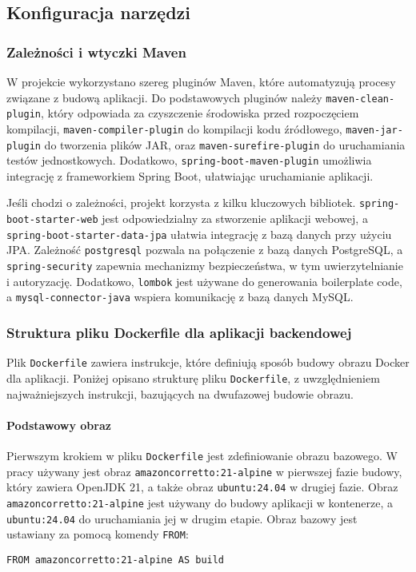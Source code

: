 \subsection{Konfiguracja narzędzi} 
\subsubsection{Zależności i wtyczki Maven}
W projekcie wykorzystano szereg pluginów Maven, które automatyzują procesy związane z budową aplikacji. Do podstawowych pluginów należy \texttt{maven-clean-plugin}, który odpowiada za czyszczenie środowiska przed rozpoczęciem kompilacji, \texttt{maven-compiler-plugin} do kompilacji kodu źródłowego, \texttt{maven-jar-plugin} do tworzenia plików JAR, oraz \texttt{maven-surefire-plugin} do uruchamiania testów jednostkowych. Dodatkowo, \texttt{spring-boot-maven-plugin} umożliwia integrację z frameworkiem Spring Boot, ułatwiając uruchamianie aplikacji.

Jeśli chodzi o zależności, projekt korzysta z kilku kluczowych bibliotek. \texttt{spring-boot-starter-web} jest odpowiedzialny za stworzenie aplikacji webowej, a \texttt{spring-boot-starter-data-jpa} ułatwia integrację z bazą danych przy użyciu JPA. Zależność \texttt{postgresql} pozwala na połączenie z bazą danych PostgreSQL, a \texttt{spring-security} zapewnia mechanizmy bezpieczeństwa, w tym uwierzytelnianie i autoryzację. Dodatkowo, \texttt{lombok} jest używane do generowania boilerplate code, a \texttt{mysql-connector-java} wspiera komunikację z bazą danych MySQL.




\subsubsection{Struktura pliku Dockerfile dla aplikacji backendowej}

Plik \texttt{Dockerfile} zawiera instrukcje, które definiują sposób budowy obrazu Docker dla aplikacji. Poniżej opisano strukturę pliku \texttt{Dockerfile}, z uwzględnieniem najważniejszych instrukcji, bazujących na dwufazowej budowie obrazu.

\paragraph{Podstawowy obraz}
Pierwszym krokiem w pliku \texttt{Dockerfile} jest zdefiniowanie obrazu bazowego. W pracy używany jest obraz \texttt{amazoncorretto:21-alpine} w pierwszej fazie budowy, który zawiera OpenJDK 21, a także obraz \texttt{ubuntu:24.04} w drugiej fazie. Obraz \texttt{amazoncorretto:21-alpine} jest używany do budowy aplikacji w kontenerze, a \texttt{ubuntu:24.04} do uruchamiania jej w drugim etapie. Obraz bazowy jest ustawiany za pomocą komendy \texttt{FROM}:
\begin{lstlisting}
FROM amazoncorretto:21-alpine AS build
\end{lstlisting}

